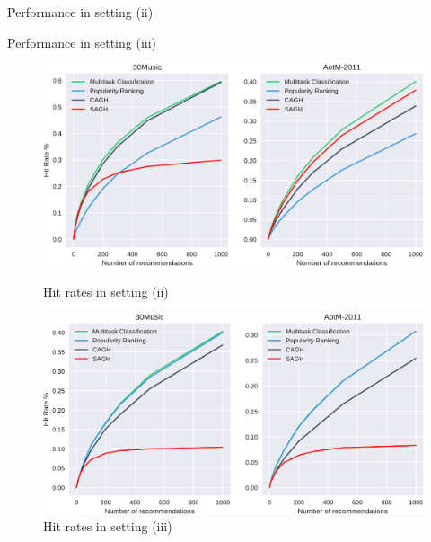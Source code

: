 \begin{table}[!t]
    \centering
    \begin{minipage}{.5\textwidth}
        \centering
        \caption{Performance in setting (ii)}
        \label{tab:perf1}
        \resizebox{.95\textwidth}{!}{
        
        }
    \end{minipage}%
    \begin{minipage}{0.5\textwidth}
        \centering
        \caption{Performance in setting (iii)}
        \label{tab:perf2}
        \resizebox{.95\textwidth}{!}{
        
        }
    \end{minipage}
\end{table}


\begin{figure}[t]
    \centering
    \begin{minipage}{.5\textwidth}
        \centering
        \includegraphics[width=.925\linewidth]{fig/hitrate1.pdf}
        \caption{Hit rates in setting (ii)}
        \label{fig:hr1}
    \end{minipage}%
    \begin{minipage}{0.5\textwidth}
        \centering
        \includegraphics[width=.925\linewidth]{fig/hitrate2.pdf}
        \caption{Hit rates in setting (iii)}
        \label{fig:hr2}
    \end{minipage}
\end{figure}



